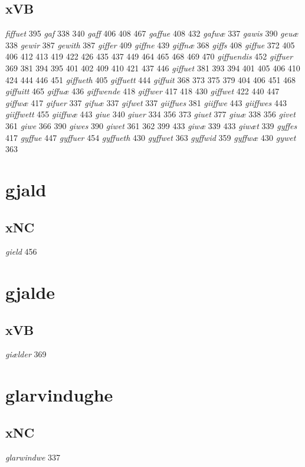 \documentclass[a4paper,twocolumn]{article}
\begin{document}
\subsection{xVB}
\label{sec:org4684f4b}
\emph{fiffuet} 395 \emph{gaf} 338 340 \emph{gaff} 406 408 467 \emph{gaffue} 408 432 \emph{gafwæ} 337 \emph{gawis} 390 \emph{geuæ} 338 \emph{gewir} 387 \emph{gewith} 387 \emph{giffer} 409 \emph{giffne} 439 \emph{giffnæ} 368 \emph{giffs} 408 \emph{giffue} 372 405 406 412 413 419 422 426 435 437 449 464 465 468 469 470 \emph{giffuendis} 452 \emph{giffuer} 369 381 394 395 401 402 409 410 421 437 446 \emph{giffuet} 381 393 394 401 405 406 410 424 444 446 451 \emph{giffueth} 405 \emph{giffuett} 444 \emph{giffuit} 368 373 375 379 404 406 451 468 \emph{giffuitt} 465 \emph{giffuæ} 436 \emph{giffwende} 418 \emph{giffwer} 417 418 430 \emph{giffwet} 422 440 447 \emph{giffwæ} 417 \emph{gifuer} 337 \emph{gifuæ} 337 \emph{gifwet} 337 \emph{giiffues} 381 \emph{giiffwe} 443 \emph{giiffwes} 443 \emph{giiffwett} 455 \emph{giiffwæ} 443 \emph{giue} 340 \emph{giuer} 334 356 373 \emph{giuet} 377 \emph{giuæ} 338 356 \emph{givet} 361 \emph{giwe} 366 390 \emph{giwes} 390 \emph{giwet} 361 362 399 433 \emph{giwæ} 339 433 \emph{giwæt} 339 \emph{gyffes} 417 \emph{gyffue} 447 \emph{gyffuer} 454 \emph{gyffueth} 430 \emph{gyffwet} 363 \emph{gyffwid} 359 \emph{gyffwæ} 430 \emph{gywet} 363 
\section{gjald}
\label{sec:orgbd8b498}
\subsection{xNC}
\label{sec:org8e40806}
\emph{gield} 456 
\section{gjalde}
\label{sec:org1e58b1a}
\subsection{xVB}
\label{sec:org2373c37}
\emph{giælder} 369 
\section{glarvindughe}
\label{sec:orgce0b37c}
\subsection{xNC}
\label{sec:org28046b4}
\emph{glarwindwe} 337 
\end{document}
